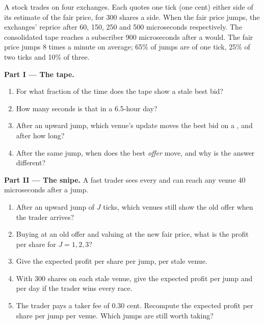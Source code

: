 \begin{problem}\label{pb:m1:us-equity-market-structure:1}
A stock trades on four exchanges. Each quotes one tick (one cent) either side
of its estimate of the fair price, for 300 shares a side. When the fair price
jumps, the exchanges'  reprice after 60, 150, 250 and 500
microseconds respectively. The consolidated tape reaches a subscriber 900
microseconds after a  would. The fair price jumps 8 times a minute
on average; 65\% of jumps are of one tick, 25\% of two ticks and 10\% of three.

\medskip\noindent\textbf{Part I --- The tape.}
\begin{enumerate}
\item For what fraction of the time does the tape show a stale best bid?
\item How many seconds is that in a 6.5-hour day?
\item After an upward jump, which venue's update moves the best bid on a
, and after how long?
\item After the same jump, when does the best \emph{offer} move, and why is
the answer different?
\end{enumerate}

\medskip\noindent\textbf{Part II --- The snipe.}
A fast trader sees every  and can reach any venue 40 microseconds
after a jump.
\begin{enumerate}[resume]
\item After an upward jump of $J$ ticks, which venues still show the old
offer when the trader arrives?
\item Buying at an old offer and valuing at the new fair price, what is the
profit per share for $J = 1, 2, 3$?
\item Give the expected profit per share per jump, per stale venue.
\item With 300 shares on each stale venue, give the expected profit per
jump and per day if the trader wins every race.
\item The trader pays a taker fee of 0.30 cent. Recompute the expected profit
per share per jump per venue. Which jumps are still worth taking?
\end{enumerate}


\end{problem}
